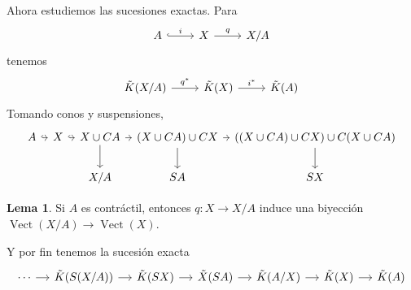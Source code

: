 \documentclass[spanish]{book}
\theoremstyle{definition}
\newtheorem*{lema}{Lema}
\begin{document}
Ahora estudiemos las sucesiones exactas.
Para 
\[\begin{tikzcd}
	A\arrow[hook,r,"i"]&X\arrow[r,"q"]&X/A
\end{tikzcd}\]
tenemos
\[\begin{tikzcd}
	\tilde{K}(X/A)\arrow[r,"q^*"]&\tilde{K}(X)\arrow[r,"i^*"]&\tilde{K}(A)
\end{tikzcd}\]
Tomando conos y suspensiones,
\[\begin{tikzcd}[column sep=tiny]
	A\arrow[r,hook]&X\arrow[r,hook]&X\cup CA\arrow[r]\arrow[d]&(X\cup CA)\cup CX\arrow[d]\arrow[r]&((X\cup CA)\cup CX)\cup C(X\cup CA)\arrow[d]\\
	&&X/A&SA&SX
\end{tikzcd}\]
\begin{lema}
	Si $A$ es contráctil, entonces $q:X\to X/A$ induce una biyección $\operatorname{Vect}(X/A)\to\operatorname{Vect}(X)$.
\end{lema}
Y por fin tenemos la sucesión exacta
\[\begin{tikzcd}[column sep=small]
	\cdots\arrow[r]&\tilde{K}(S(X/A))\arrow[r]&\tilde{K}(SX)\arrow[r]&\tilde{X}(SA)\arrow[r]&\tilde{K}(A/X)\arrow[r]&\tilde{K}(X)\arrow[r]&\tilde{K}(A)
\end{tikzcd}\]
\end{document}
